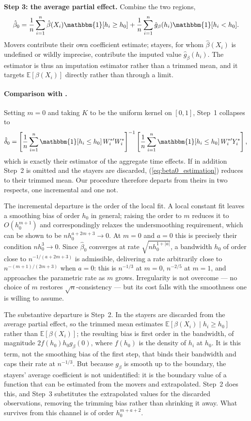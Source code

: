 \documentclass{article}
\newcommand{\E}{\mathbb{E}}
\newcommand{\I}{\mathbbm{1}}
\begin{document}
\medskip\noindent
\textbf{Step 3: the average partial effect.}
Combine the two regions,
\begin{align}\label{eq:beta0_estimation}
    \hat{\beta}_0 = \frac{1}{n}\sum_{i=1}^n \hat{\beta}(X_i)\I[h_i\geq h_0] + \frac{1}{n}\sum_{i=1}^n \hat{g}_{\beta}(h_i)\I[h_i< h_0].
\end{align}
Movers contribute their own coefficient estimate; stayers, for whom $\hat\beta(X_i)$ is undefined or wildly imprecise, contribute the imputed value $\hat g_\beta(h_i)$. The estimator is thus an imputation estimator rather than a trimmed mean, and it targets $\E[\beta(X_i)]$ directly rather than through a limit.

\paragraph{Comparison with \cite{grahampowell}.}
Setting $m=0$ and taking $K$ to be the uniform kernel on $[0,1]$, Step~1 collapses to
\[
    \hat{\delta}_0 = \left[\frac{1}{n}\sum_{i=1}^n \I[h_i\le h_0]\,W_i^{*\prime}W_i^{*}\right]^{-1}\left[\frac{1}{n}\sum_{i=1}^n \I[h_i\le h_0]\,W_i^{*\prime} Y_i^{*}\right],
\]
which is exactly their estimator of the aggregate time effects. If in addition Step~2 is omitted and the stayers are discarded, (\ref{eq:beta0_estimation}) reduces to their trimmed mean. Our procedure therefore departs from theirs in two respects, one incremental and one not.

The incremental departure is the order of the local fit. A local constant fit leaves a smoothing bias of order $h_0$ in general; raising the order to $m$ reduces it to $O(h_0^{m+1})$ and correspondingly relaxes the undersmoothing requirement, which can be shown to be $nh_0^{a+2m+3}\to0$. At $m=0$ and $a=0$ this is precisely their condition $nh_0^{3}\to0$. Since $\hat\beta_0$ converges at rate $\sqrt{nh_0^{1+|a|}}$, a bandwidth $h_0$ of order close to $n^{-1/(a+2m+3)}$ is admissible, delivering a rate arbitrarily close to $n^{-(m+1)/(2m+3)}$ when $a=0$: this is $n^{-1/3}$ at $m=0$, $n^{-2/5}$ at $m=1$, and approaches the parametric rate as $m$ grows. Irregularity is not overcome --- no choice of $m$ restores $\sqrt n$-consistency --- but its cost falls with the smoothness one is willing to assume.

The substantive departure is Step~2. In \cite{grahampowell} the stayers are discarded from the average partial effect, so the trimmed mean estimates $\E[\beta(X_i)\mid h_i\ge h_0]$ rather than $\E[\beta(X_i)]$; the resulting bias is first order in the bandwidth, of magnitude $2f(h_0)h_0g_\beta(0)$, where $f(h_0)$ is the density of $h_i$ at $h_0$. It is this term, not the smoothing bias of the first step, that binds their bandwidth and caps their rate at $n^{-1/3}$. But because $g_\beta$ is smooth up to the boundary, the stayers' average coefficient is not unidentified: it is the boundary value of a function that can be estimated from the movers and extrapolated. Step~2 does this, and Step~3 substitutes the extrapolated values for the discarded observations, removing the trimming bias rather than shrinking it away. What survives from this channel is of order $h_0^{m+a+2}$.
\end{document}
